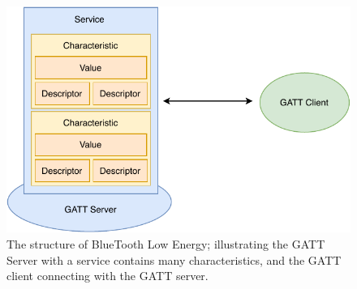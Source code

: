 \begin{figure}[h!]
    \centering
    \includegraphics[scale=0.85]{images/BLE2.pdf}
    \caption{The structure of BlueTooth Low Energy; illustrating the GATT Server with a service contains many characteristics, and the GATT client connecting with the GATT server.}
    \label{fig:BLE}
\end{figure}

